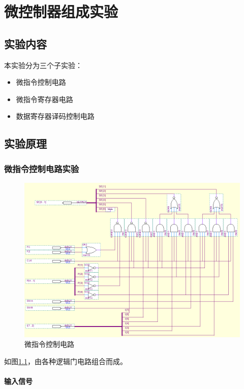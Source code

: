 \chapter{微控制器组成实验}

\section{实验内容}

本实验分为三个子实验：

\begin{itemize}
    \item 微指令控制电路
    \item 微指令寄存器电路
    \item 数据寄存器译码控制电路
\end{itemize}

\section{实验原理}

\subsection{微指令控制电路实验}

\begin{figure}[H]
\centering
\includegraphics[width=\textwidth]{images/prin5_1.png}
\caption{微指令控制电路}
\label{fig:prin5_1}
\end{figure}

如图\ref{fig:prin5_1}，由各种逻辑门电路组合而成。

\subsubsection{输入信号}

